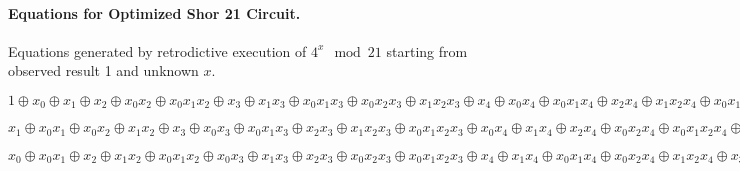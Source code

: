 \documentclass{article}
\begin{document}
\begin{refsection}
\paragraph*{Equations for Optimized Shor 21 Circuit.}
Equations generated by retrodictive execution of $4^x \mod{21}$
starting from observed result 1 and unknown $x$. 

$1 \oplus x_0 \oplus x_1 \oplus x_2 \oplus x_0x_2 \oplus x_0x_1x_2 \oplus x_3 \oplus x_1x_3 \oplus x_0x_1x_3 \oplus x_0x_2x_3 \oplus x_1x_2x_3 \oplus x_4 \oplus x_0x_4 \oplus x_0x_1x_4 \oplus x_2x_4 \oplus x_1x_2x_4 \oplus x_0x_1x_2x_4 \oplus x_0x_3x_4 \oplus x_1x_3x_4 \oplus x_2x_3x_4 \oplus x_0x_2x_3x_4 \oplus x_0x_1x_2x_3x_4 \oplus x_5 \oplus x_1x_5 \oplus x_0x_1x_5 \oplus x_0x_2x_5 \oplus x_1x_2x_5 \oplus x_3x_5 \oplus x_0x_3x_5 \oplus x_0x_1x_3x_5 \oplus x_2x_3x_5 \oplus x_1x_2x_3x_5 \oplus x_0x_1x_2x_3x_5 \oplus x_0x_4x_5 \oplus x_1x_4x_5 \oplus x_2x_4x_5 \oplus x_0x_2x_4x_5 \oplus x_0x_1x_2x_4x_5 \oplus x_3x_4x_5 \oplus x_1x_3x_4x_5 \oplus x_0x_1x_3x_4x_5 \oplus x_0x_2x_3x_4x_5 \oplus x_1x_2x_3x_4x_5 = 1$

\bigskip

$x_1 \oplus x_0x_1 \oplus x_0x_2 \oplus x_1x_2 \oplus x_3 \oplus x_0x_3 \oplus x_0x_1x_3 \oplus x_2x_3 \oplus x_1x_2x_3 \oplus x_0x_1x_2x_3 \oplus x_0x_4 \oplus x_1x_4 \oplus x_2x_4 \oplus x_0x_2x_4 \oplus x_0x_1x_2x_4 \oplus x_3x_4 \oplus x_1x_3x_4 \oplus x_0x_1x_3x_4 \oplus x_0x_2x_3x_4 \oplus x_1x_2x_3x_4 \oplus x_5 \oplus x_0x_5 \oplus x_0x_1x_5 \oplus x_2x_5 \oplus x_1x_2x_5 \oplus x_0x_1x_2x_5 \oplus x_0x_3x_5 \oplus x_1x_3x_5 \oplus x_2x_3x_5 \oplus x_0x_2x_3x_5 \oplus x_0x_1x_2x_3x_5 \oplus x_4x_5 \oplus x_1x_4x_5 \oplus x_0x_1x_4x_5 \oplus x_0x_2x_4x_5 \oplus x_1x_2x_4x_5 \oplus x_3x_4x_5 \oplus x_0x_3x_4x_5 \oplus x_0x_1x_3x_4x_5 \oplus x_2x_3x_4x_5 \oplus x_1x_2x_3x_4x_5 \oplus x_0x_1x_2x_3x_4x_5 = 0$

\bigskip

$x_0 \oplus x_0x_1 \oplus x_2 \oplus x_1x_2 \oplus x_0x_1x_2 \oplus x_0x_3 \oplus x_1x_3 \oplus x_2x_3 \oplus x_0x_2x_3 \oplus x_0x_1x_2x_3 \oplus x_4 \oplus x_1x_4 \oplus x_0x_1x_4 \oplus x_0x_2x_4 \oplus x_1x_2x_4 \oplus x_3x_4 \oplus x_0x_3x_4 \oplus x_0x_1x_3x_4 \oplus x_2x_3x_4 \oplus x_1x_2x_3x_4 \oplus x_0x_1x_2x_3x_4 \oplus x_0x_5 \oplus x_1x_5 \oplus x_2x_5 \oplus x_0x_2x_5 \oplus x_0x_1x_2x_5 \oplus x_3x_5 \oplus x_1x_3x_5 \oplus x_0x_1x_3x_5 \oplus x_0x_2x_3x_5 \oplus x_1x_2x_3x_5 \oplus x_4x_5 \oplus x_0x_4x_5 \oplus x_0x_1x_4x_5 \oplus x_2x_4x_5 \oplus x_1x_2x_4x_5 \oplus x_0x_1x_2x_4x_5 \oplus x_0x_3x_4x_5 \oplus x_1x_3x_4x_5 \oplus x_2x_3x_4x_5 \oplus x_0x_2x_3x_4x_5 \oplus x_0x_1x_2x_3x_4x_5 = 0$


\end{refsection}
\end{document}
